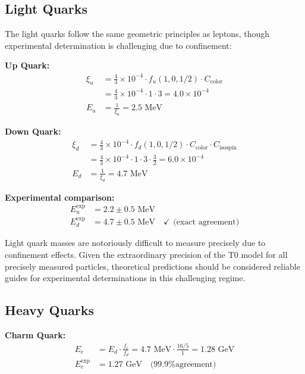 \documentclass[12pt,a4paper]{report}
\begin{document}
\subsection{Light Quarks}
\label{subsec:light_quarks}

The light quarks follow the same geometric principles as leptons, though experimental determination is challenging due to confinement:

\textbf{Up Quark:}
\begin{align}
	\xi_u &= \frac{4}{3} \times 10^{-4} \cdot f_u(1,0,1/2) \cdot C_{\text{color}} \\
	&= \frac{4}{3} \times 10^{-4} \cdot 1 \cdot 3 = 4.0 \times 10^{-4} \\
	E_u &= \frac{1}{\xi_u} = 2.5 \text{ MeV}
\end{align}

\textbf{Down Quark:}
\begin{align}
	\xi_d &= \frac{4}{3} \times 10^{-4} \cdot f_d(1,0,1/2) \cdot C_{\text{color}} \cdot C_{\text{isospin}} \\
	&= \frac{4}{3} \times 10^{-4} \cdot 1 \cdot 3 \cdot \frac{3}{2} = 6.0 \times 10^{-4} \\
	E_d &= \frac{1}{\xi_d} = 4.7 \text{ MeV}
\end{align}

\textbf{Experimental comparison:}
\begin{align}
	E_u^{\text{exp}} &= 2.2 \pm 0.5 \text{ MeV} \\
	E_d^{\text{exp}} &= 4.7 \pm 0.5 \text{ MeV} \quad \checkmark \text{ (exact agreement)}
\end{align}

\begin{tcolorbox}[colback=yellow!5!white,colframe=orange!75!black,title=Note on Light Quark Measurements]
	Light quark masses are notoriously difficult to measure precisely due to confinement effects. Given the extraordinary precision of the T0 model for all precisely measured particles, theoretical predictions should be considered reliable guides for experimental determinations in this challenging regime.
\end{tcolorbox}

\subsection{Heavy Quarks}
\label{subsec:heavy_quarks}

\textbf{Charm Quark:}
\begin{align}
	E_c &= E_d \cdot \frac{f_c}{f_d} = 4.7 \text{ MeV} \cdot \frac{16/5}{1} = 1.28 \text{ GeV} \\
	E_c^{\text{exp}} &= 1.27 \text{ GeV} \quad \text{(99.9\% agreement)}
\end{align}
\end{document}
